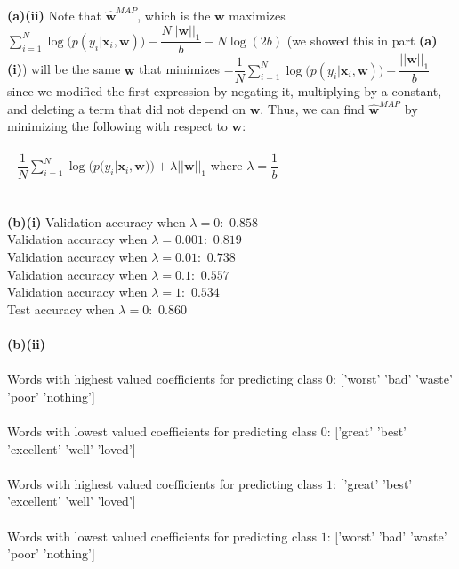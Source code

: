\documentclass[submit]{harvardml}
\begin{document}
\textbf{(a)(ii)} Note that $\mathbf{\hat w}^{MAP}$, which is the $\mathbf{w}$ maximizes $\displaystyle\sum_{i=1}^{N}\log\big(p(y_i|\mathbf{x}_i,\mathbf{w})\big)-\dfrac{N||\mathbf{w}||_1}{b}-N\log(2b)$ (we showed this in part \textbf{(a)(i)}) will be the same $\mathbf{w}$ that minimizes $-\dfrac{1}{N}\displaystyle\sum_{i=1}^{N}\log\big(p(y_i|\mathbf{x}_i,\mathbf{w})\big)+\dfrac{||\mathbf{w}||_1}{b}$ since we modified the first expression by negating it, multiplying by a constant, and deleting a term that did not depend on $\mathbf{w}$. Thus, we can find $\mathbf{\hat w}^{MAP}$ by minimizing the following with respect to $\mathbf{w}$:\\\\
$-\dfrac{1}{N}\displaystyle\sum_{i=1}^{N}\log\big(p(y_i|\mathbf{x}_i,\mathbf{w})\big)+\lambda||\mathbf{w}||_1$ where $\lambda=\dfrac{1}{b}$\\\\\\

\textbf{(b)(i)} Validation accuracy when $\lambda=0:$ $0.858$\\
Validation accuracy when $\lambda=0.001:$ $0.819$\\
Validation accuracy when $\lambda=0.01:$ $0.738$\\
Validation accuracy when $\lambda=0.1:$ $0.557$\\
Validation accuracy when $\lambda=1:$ $0.534$\\
Test accuracy when $\lambda=0:$ $0.860$\\\\

\textbf{(b)(ii)}\\\\
Words with highest valued coefficients for predicting class $0$: ['worst' 'bad' 'waste' 'poor' 'nothing']\\\\
Words with lowest valued coefficients for predicting class $0$: ['great' 'best' 'excellent' 'well' 'loved']\\\\
Words with highest valued coefficients for predicting class $1$: ['great' 'best' 'excellent' 'well' 'loved']\\\\
Words with lowest valued coefficients for predicting class $1$: ['worst' 'bad' 'waste' 'poor' 'nothing']\\\\\\
\end{document}
